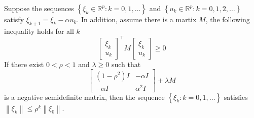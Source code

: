 \documentclass[11pt]{elegantbook}
\begin{document}
\begin{lemma}
    Suppose the sequences $\left\{\xi_{k} \in \mathbb{R}^{p}: k=0,1, \ldots\right\}$ and $\left\{u_{k} \in \mathbb{R}^{p}: k=0,1,2, \ldots\right\}$ satisfy $\xi_{k+1}=\xi_{k}-\alpha u_{k} .$ In addition, assume there is a martix $M$, the following inequality holds for all $k$
    $$
    \left[\begin{array}{l}
    \xi_{k} \\
    u_{k}
    \end{array}\right]^{\top} M\left[\begin{array}{l}
    \xi_{k} \\
    u_{k}
    \end{array}\right] \geq 0
    $$
    If there exist $0<\rho<1$ and $\lambda \geq 0$ such that
    $$
    \left[\begin{array}{cc}
    \left(1-\rho^{2}\right) I & -\alpha I \\
    -\alpha I & \alpha^{2} I
    \end{array}\right]+\lambda M
    $$
    is a negative semidefinite matrix, then the sequence $\left\{\xi_{k}: k=0,1, \ldots\right\}$ satisfies $\left\|\xi_{k}\right\| \leq \rho^{k}\left\|\xi_{0}\right\|$.
\end{lemma}
\end{document}
